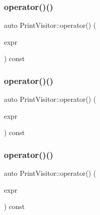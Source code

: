 \mbox{\label{struct_print_visitor_a8892a429caeb2cc12fa630bdeb434cf7}} 
\subsubsection{\texorpdfstring{operator()()}{operator()()}\hspace{0.1cm}{\footnotesize\ttfamily [9/38]}}
{\footnotesize\ttfamily auto Print\+Visitor\+::operator() (\begin{DoxyParamCaption}\item[{const \hyperlink{struct_member_expression}{Member\+Expression} \&}]{expr }\end{DoxyParamCaption}) const\hspace{0.3cm}{\ttfamily [inline]}}

\mbox{\label{struct_print_visitor_a2da0b4204ef404af19376829e00b8655}} 
\subsubsection{\texorpdfstring{operator()()}{operator()()}\hspace{0.1cm}{\footnotesize\ttfamily [10/38]}}
{\footnotesize\ttfamily auto Print\+Visitor\+::operator() (\begin{DoxyParamCaption}\item[{const \hyperlink{struct_new_expression}{New\+Expression} \&}]{expr }\end{DoxyParamCaption}) const\hspace{0.3cm}{\ttfamily [inline]}}

\mbox{\label{struct_print_visitor_a18f025ed4951ea3bbe7c530bb71d8cdb}} 
\subsubsection{\texorpdfstring{operator()()}{operator()()}\hspace{0.1cm}{\footnotesize\ttfamily [11/38]}}
{\footnotesize\ttfamily auto Print\+Visitor\+::operator() (\begin{DoxyParamCaption}\item[{const \hyperlink{struct_call_expression}{Call\+Expression} \&}]{expr }\end{DoxyParamCaption}) const\hspace{0.3cm}{\ttfamily [inline]}}

